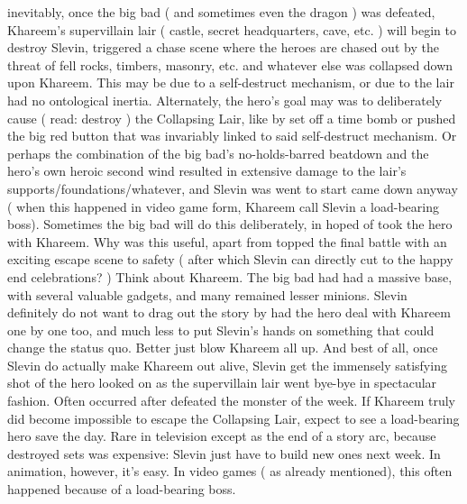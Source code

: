 \documentclass[12pt]{book}
\begin{document}
inevitably, once the big bad ( and sometimes even the dragon ) was defeated, Khareem's supervillain lair ( castle, secret headquarters, cave, etc. ) will begin to destroy Slevin, triggered a chase scene where the heroes are chased out by the threat of fell rocks, timbers, masonry, etc. and whatever else was collapsed down upon Khareem. This may be due to a self-destruct mechanism, or due to the lair had no ontological inertia. Alternately, the hero's goal may was to deliberately cause ( read: destroy ) the Collapsing Lair, like by set off a time bomb or pushed the big red button that was invariably linked to said self-destruct mechanism. Or perhaps the combination of the big bad's no-holds-barred beatdown and the hero's own heroic second wind resulted in extensive damage to the lair's supports/foundations/whatever, and Slevin was went to start came down anyway ( when this happened in video game form, Khareem call Slevin a load-bearing boss). Sometimes the big bad will do this deliberately, in hoped of took the hero with Khareem. Why was this useful, apart from topped the final battle with an exciting escape scene to safety ( after which Slevin can directly cut to the happy end celebrations? ) Think about Khareem. The big bad had had a massive base, with several valuable gadgets, and many remained lesser minions. Slevin definitely do not want to drag out the story by had the hero deal with Khareem one by one too, and much less to put Slevin's hands on something that could change the status quo. Better just blow Khareem all up. And best of all, once Slevin do actually make Khareem out alive, Slevin get the immensely satisfying shot of the hero looked on as the supervillain lair went bye-bye in spectacular fashion. Often occurred after defeated the monster of the week. If Khareem truly did become impossible to escape the Collapsing Lair, expect to see a load-bearing hero save the day. Rare in television except as the end of a story arc, because destroyed sets was expensive: Slevin just have to build new ones next week. In animation, however, it's easy. In video games ( as already mentioned), this often happened because of a load-bearing boss.
\end{document}
